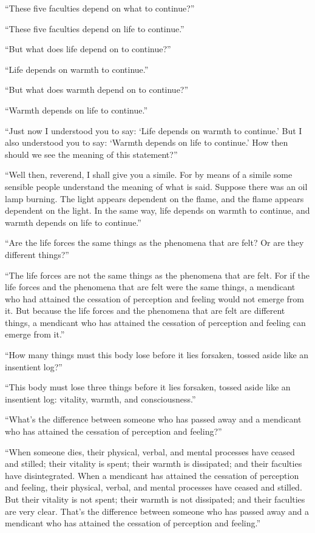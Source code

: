 \documentclass[12pt,openany]{book}%
\begin{document}
“These five faculties depend on what to continue?” 

“These five faculties depend on life to continue.” 

“But what does life depend on to continue?” 

“Life depends on warmth to continue.” 

“But what does warmth depend on to continue?” 

“Warmth depends on life to continue.” 

“Just now I understood you to say: ‘Life depends on warmth to continue.’ But I also understood you to say: ‘Warmth depends on life to continue.’ How then should we see the meaning of this statement?” 

“Well then, reverend, I shall give you a simile. For by means of a simile some sensible people understand the meaning of what is said. Suppose there was an oil lamp burning. The light appears dependent on the flame, and the flame appears dependent on the light. In the same way, life depends on warmth to continue, and warmth depends on life to continue.” 

“Are the life forces the same things as the phenomena that are felt? Or are they different things?” 

“The life forces are not the same things as the phenomena that are felt. For if the life forces and the phenomena that are felt were the same things, a mendicant who had attained the cessation of perception and feeling would not emerge from it. But because the life forces and the phenomena that are felt are different things, a mendicant who has attained the cessation of perception and feeling can emerge from it.” 

“How many things must this body lose before it lies forsaken, tossed aside like an insentient log?” 

“This body must lose three things before it lies forsaken, tossed aside like an insentient log: vitality, warmth, and consciousness.” 

“What’s the difference between someone who has passed away and a mendicant who has attained the cessation of perception and feeling?” 

“When someone dies, their physical, verbal, and mental processes have ceased and stilled; their vitality is spent; their warmth is dissipated; and their faculties have disintegrated. When a mendicant has attained the cessation of perception and feeling, their physical, verbal, and mental processes have ceased and stilled. But their vitality is not spent; their warmth is not dissipated; and their faculties are very clear. That’s the difference between someone who has passed away and a mendicant who has attained the cessation of perception and feeling.” 
\end{document}
